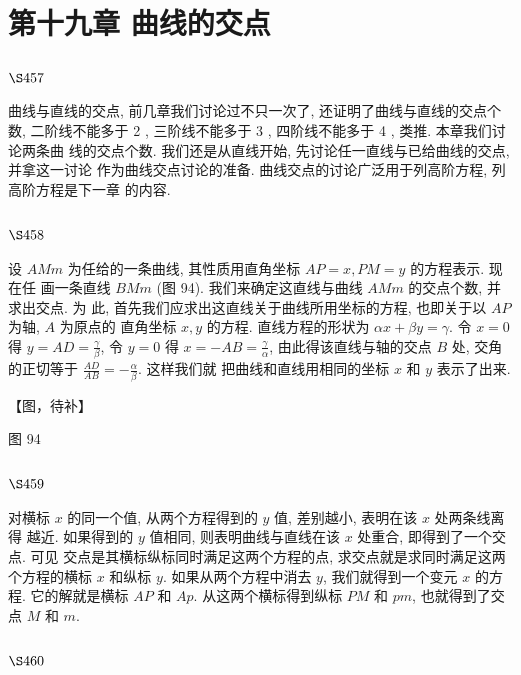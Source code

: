 \chapter{第十九章 曲线的交点}

\section{$\S 457$}

曲线与直线的交点, 前几章我们讨论过不只一次了, 还证明了曲线与直线的交点个 数, 二阶线不能多于 2 , 三阶线不能多于 3 , 四阶线不能多于 4 , 类推. 本章我们讨论两条曲 线的交点个数. 我们还是从直线开始, 先讨论任一直线与已给曲线的交点, 并拿这一讨论 作为曲线交点讨论的准备. 曲线交点的讨论广泛用于列高阶方程, 列高阶方程是下一章 的内容.

\section{$\S 458$}

设 $A M m$ 为任给的一条曲线, 其性质用直角坐标 $A P=x, P M=y$ 的方程表示. 现在任 画一条直线 $B M m$ (图 94). 我们来确定这直线与曲线 $A M m$ 的交点个数, 并求出交点. 为 此, 首先我们应求出这直线关于曲线所用坐标的方程, 也即关于以 $A P$ 为轴, $A$ 为原点的 直角坐标 $x, y$ 的方程. 直线方程的形状为 $\alpha x+\beta y=\gamma$. 令 $x=0$ 得 $y=A D=\frac{\gamma}{\beta}$, 令 $y=0$ 得 $x=-A B=\frac{\gamma}{\alpha}$, 由此得该直线与轴的交点 $B$ 处, 交角的正切等于 $\frac{A D}{A B}=-\frac{\alpha}{\beta}$. 这样我们就 把曲线和直线用相同的坐标 $x$ 和 $y$ 表示了出来.


【图，待补】

图 94

\section{$\S 459$}

对横标 $x$ 的同一个值, 从两个方程得到的 $y$ 值, 差别越小, 表明在该 $x$ 处两条线离得 越近. 如果得到的 $y$ 值相同, 则表明曲线与直线在该 $x$ 处重合, 即得到了一个交点. 可见 交点是其横标纵标同时满足这两个方程的点, 求交点就是求同时满足这两个方程的横标 $x$ 和纵标 $y$. 如果从两个方程中消去 $y$, 我们就得到一个变元 $x$ 的方程. 它的解就是横标 $A P$ 和 $A p$. 从这两个横标得到纵标 $P M$ 和 $p m$, 也就得到了交点 $M$ 和 $m$.

\section{$\S 460$}

